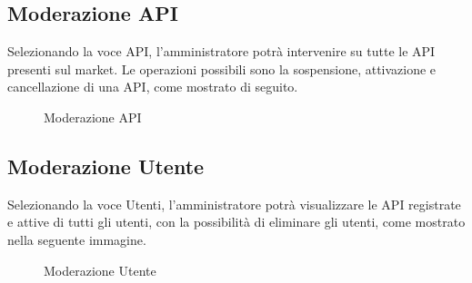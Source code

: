 	
\subsection{Moderazione API}
Selezionando la voce API, l'amministratore potrà intervenire su tutte le API presenti sul market. Le operazioni possibili sono la sospensione, attivazione e cancellazione di una API, come mostrato di seguito.

	\label{Moderazione API}
	\begin{figure}[H]
		\centering
		\caption{Moderazione API}
	\end{figure}


\subsection{Moderazione Utente}
Selezionando la voce Utenti, l'amministratore potrà visualizzare le API registrate e attive di tutti gli utenti, con la possibilità di eliminare gli utenti, come mostrato nella seguente immagine.

\label{Moderazione Utente}
\begin{figure}[H]
	\centering
	\caption{Moderazione Utente}
\end{figure}
